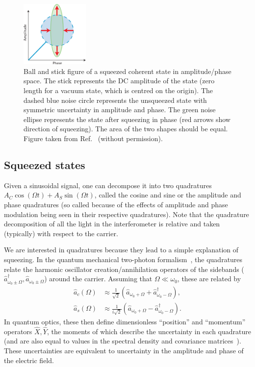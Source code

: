 \documentclass[aps,pra,superscriptaddress,reprint,nofootinbib]{revtex4-1}
\begin{document}
\begin{figure}[ht]%
	\begin{center}
	\includegraphics[width=0.3\textwidth]{figures/ball_and_stick_squeezed_state.png}
	\end{center}
	\caption{Ball and stick figure of a squeezed coherent state in amplitude/phase space. The stick represents the DC amplitude of the state (zero length for a vacuum state, which is centred on the origin). The dashed blue noise circle represents the unsqueezed state with symmetric uncertainty in amplitude and phase. The green noise ellipse represents the state after squeezing in phase (red arrows show direction of squeezing). The area of the two shapes should be equal. Figure taken from Ref.~\cite{Sparkes2013StorageAM} (without permission).}
	\label{fig:ball_and_stick_squeezed_state}
\end{figure}

\subsection{Squeezed states}

Given a sinusoidal signal, one can decompose it into two quadratures $A_C \cos(\Omega t) + A_S \sin(\Omega t)$, called the cosine and sine or the amplitude and phase quadratures (so called because of the effects of amplitude and phase modulation being seen in their respective quadratures). Note that the quadrature decomposition of all the light in the interferometer is relative and taken (typically) with respect to the carrier.


We are interested in quadratures because they lead to a simple explanation of squeezing. In the quantum mechanical two-photon formalism~\cite{Danilishin_2012}, the quadratures relate the harmonic oscillator creation/annihilation operators of the sidebands ($\hat{a}_{\omega_0 \pm \Omega}^\dagger, \hat{a}_{\omega_0 \pm \Omega}$) around the carrier. Assuming that $\Omega \ll \omega_0$, these are related by
\begin{align*}
\hat{a}_c(\Omega) &\approx \frac{1}{\sqrt{2}} (\hat{a}_{\omega_0 + \Omega} + \hat{a}_{\omega_0 - \Omega}^\dagger),\\
\hat{a}_s(\Omega) &\approx \frac{1}{i \sqrt{2}} (\hat{a}_{\omega_0 + \Omega} - \hat{a}_{\omega_0 - \Omega}^\dagger).
\end{align*}
In quantum optics, these then define dimensionless “position” and “momentum” operators $\hat{X}, \hat{Y}$, the moments of which describe the uncertainty in each quadrature (and are also equal to values in the spectral density and covariance matrices~\cite{Danilishin_2012}). These uncertainties are equivalent to uncertainty in the amplitude and phase of the electric field.
\end{document}
